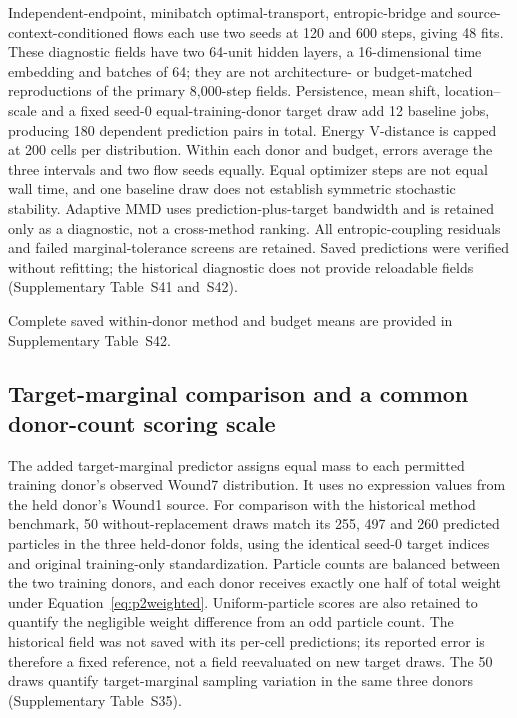 \documentclass[10pt,a4paper]{article}
\begin{document}
Independent-endpoint, minibatch optimal-transport, entropic-bridge and source-context-conditioned flows each use two seeds at 120 and 600 steps, giving 48 fits. These diagnostic fields have two 64-unit hidden layers, a 16-dimensional time embedding and batches of 64; they are not architecture- or budget-matched reproductions of the primary 8,000-step fields. Persistence, mean shift, location--scale and a fixed seed-0 equal-training-donor target draw add 12 baseline jobs, producing 180 dependent prediction pairs in total. Energy V-distance is capped at 200 cells per distribution. Within each donor and budget, errors average the three intervals and two flow seeds equally. Equal optimizer steps are not equal wall time, and one baseline draw does not establish symmetric stochastic stability. Adaptive MMD uses prediction-plus-target bandwidth and is retained only as a diagnostic, not a cross-method ranking. All entropic-coupling residuals and failed marginal-tolerance screens are retained. Saved predictions were verified without refitting; the historical diagnostic does not provide reloadable fields (Supplementary Table~S41 and~S42).

Complete saved within-donor method and budget means are provided in Supplementary Table~S42.

\subsection{Target-marginal comparison and a common donor-count scoring scale}
The added target-marginal predictor assigns equal mass to each permitted training donor's observed Wound7 distribution. It uses no expression values from the held donor's Wound1 source. For comparison with the historical method benchmark, 50 without-replacement draws match its 255, 497 and 260 predicted particles in the three held-donor folds, using the identical seed-0 target indices and original training-only standardization. Particle counts are balanced between the two training donors, and each donor receives exactly one half of total weight under Equation~\eqref{eq:p2weighted}. Uniform-particle scores are also retained to quantify the negligible weight difference from an odd particle count. The historical field was not saved with its per-cell predictions; its reported error is therefore a fixed reference, not a field reevaluated on new target draws. The 50 draws quantify target-marginal sampling variation in the same three donors (Supplementary Table~S35).
\end{document}

